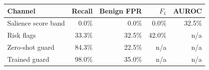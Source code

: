 \begin{tabular}{lrrrr}
\toprule
Channel & Recall & Benign FPR & $F_1$ & AUROC \\
\midrule
Salience score band & 0.0\% & 0.0\% & 0.0\% & 32.5\% \\
Risk flags & 33.3\% & 32.5\% & 42.0\% & n/a \\
Zero-shot guard & 84.3\% & 22.5\% & n/a & n/a \\
Trained guard & 98.0\% & 35.0\% & n/a & n/a \\
\bottomrule
\end{tabular}
